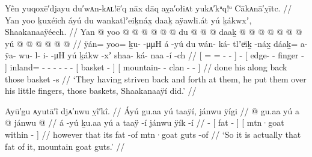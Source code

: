 \ex\label{ex:92-205-put-over-little-finger}%
%
\begingl
	\glpreamble	Yên yuqoxē′djayu du′wᴀn-kᴀʟ!ē′q nāx dāq aỵa′ołiᴀt yukᴀ′kᵘq!ᵘ Cākᴀnā′ỵītc. //
	\glpreamble	Yan yoo ḵuxéich áyú du wankatlʼeiḵnáx̱ daaḵ aÿawli.át yú ḵákwxʼ, Shaakanaaÿéech. //
	\gla	{} Yan @ yoo @  @ {} @ {} @ {} @ {} {}  @ {}
		{} du  @ {} @ {} @ {} {}
		daaḵ @  @ {} @ {} @ {} @ {} @ {} @ {}
		{} yú  @ {} {}
		{}  @ {} @ {} @ {} @ {} @ {} //
	\glb	{} ÿán= yoo= ḵu- {}  -μμH {} {} á -yú
		{} du wán- ká- tlʼeͥiḵ -náx̱ {}
		dáaḵ= a- ÿa- wu- l- i-  -μH
		{} yú ḵákw -xʼ {}
		{} shaa- ká- naa -í -ch {} //
	\glc	{}[ = = - \·  - \· {}]  -
		{}[  edge- - finger - {}]
		inland= - - - - -  -
		{}[  basket - {}]
		{}[ mountain- - clan - - {}] //
	\gld	{} done   {} {} {} {} {}  {}
		{} his  {} {} \·along {}
		back  {} {} {} {} {} {}
		{} those basket -s {}
		{}  {} {} {} {} {} //
	\glft	‘They having striven back and forth at them, he put them over his little fingers, those baskets, Shaakanaaÿí did.’
		//
\endgl
\xe


\ex\label{ex:92-206-mountain-goat-fat}%
%
\begingl
	\glpreamble	Ayū′gu ᴀyutā′î djᴀ′nwu ỵî′kî. //
	\glpreamble	Áyú gu.aa yú taaÿí, jánwu ÿígi //
	\gla	{} @ {} gu.aa {} yú a  @ {} {}
		{} jánwu  @ {} {} //
	\glb	á -yú ḵu.aa {} yú a taaÿ -í {}
		{} jánwu ÿík -í {} //
	\glc	{} - 
		{}[   fat - {}]
		{}[ mtn·goat within - {}] //
	\gld	{} {} however {} that its fat -of {}
		{} mtn·goat guts -of {} //
	\glft	‘So it is actually that fat of it, mountain goat guts.’
		//
\endgl
\xe


